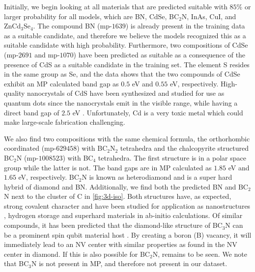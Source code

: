 




\noindent Initially, we begin looking at all materials that are predicted suitable with $85\%$ or larger probability for all models, which are BN, CdSe, BC$_2$N, InAs, CuI, and ZnCd$_3$Se$_4$. The compound BN (mp-$1639$) is already present in the training data as a suitable candidate, and therefore we believe the models recognized this as a suitable candidate with high probability. Furthermore, two compositions of CdSe (mp-$2691$ and mp-$1070$) have been predicted as suitable as a consequence of the presence of CdS as a suitable candidate in the training set. The element S resides in the same group as Se, and the data shows that the two compounds of CdSe exhibit an MP calculated band gap as $0.5$ eV and $0.55$ eV, respectively. High-quality nanocrystals of CdS have been synthesized and studied for use as quantum dots since the nanocrystals emit in the visible range, while having a direct band gap of $2.5$ eV \cite{CelebiSerdar2007SaCo, BanerjeeR2000Eots}.  Unfortunately, Cd is a very toxic metal which could make large-scale fabrication challenging.

We also find two compositions with the same chemical formula, the orthorhombic coordinated (mp-$629458$) with BC$_2$N$_2$ tetrahedra and the chalcopyrite structured BC$_2$N (mp-$1008523$) with BC$_4$ tetrahedra. The first structure is in a polar space group while the latter is not. The band gaps are in MP calculated as $1.85$ eV and $1.65$ eV, respectively. BC$_2$N is known as heterodiamond and is a super hard hybrid of diamond and BN. Additionally, we find both the predicted BN and BC$_2$N next to the cluster of C in \autoref{fig:3d-iso}.
Both structures have, as expected, strong covalent character and have been studied for application as nanostructures \cite{Gao2017}, hydrogen storage \cite{Cai2017} and superhard materials \cite{Li2017, Jiang2020} in ab-initio calculations. Of similar compounds, it has been predicted that the diamond-like structure of BC$_3$N can be a prominent spin qubit material host \cite{WangDuo2020Sqbo}. By creating a boron (B) vacancy, it will immediately lead to an NV center with similar properties as found in the NV center in diamond. If this is also possible for BC$_2$N, remains to be seen. We note that BC$_3$N is not present in MP, and therefore not present in our dataset.

